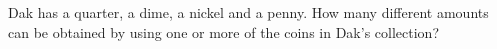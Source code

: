 Dak has a quarter, a dime, a nickel and a penny. How many different amounts can be obtained by using one or more of the coins in Dak's collection?
